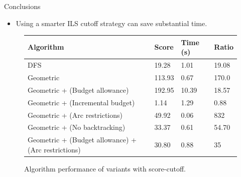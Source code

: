 \documentclass{beamer}
\begin{document}
\begin{frame}{Conclusions}
\begin{itemize}
    \item Using a smarter ILS cutoff strategy can save substantial time.
\end{itemize}
    \begin{center}
    \begin{figure}
    \begin{tabular}{|p{15em}|l|l|l|}
    \hline
    \textbf{Algorithm} & \textbf{Score} & \textbf{Time (s)} & \textbf{Ratio} \\
    \hline
    DFS & 19.28 & 1.01 & 19.08 \\
    \hline
    Geometric & 113.93 & 0.67 & 170.0 \\
    \hline
    Geometric + (Budget allowance) & 192.95 & 10.39 & 18.57 \\
    \hline
    Geometric + (Incremental budget) & 1.14 & 1.29 & 0.88 \\
    \hline
    Geometric + (Arc restrictions) & 49.92 & 0.06 & 832 \\
    \hline
    Geometric + (No backtracking) & 33.37 & 0.61 & 54.70 \\
    \hline
    Geometric + (Budget allowance) + (Arc restrictions) & 30.80 & 0.88 & 35 \\
    \hline
    \end{tabular}
    \caption{Algorithm performance of variants with score-cutoff.}
    \end{figure}
    \end{center}
\end{frame}
\end{document}
